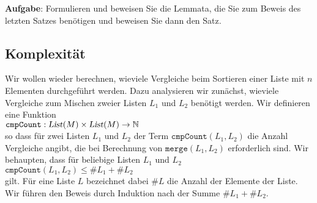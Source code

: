 \noindent
\textbf{Aufgabe}:  Formulieren und beweisen Sie die Lemmata, die Sie zum Beweis des letzten Satzes ben\"otigen
und beweisen Sie dann den Satz.

\subsection{Komplexit\"at}
Wir wollen wieder berechnen, wieviele Vergleiche beim Sortieren einer Liste mit $n$
Elementen durchgef\"uhrt werden.  Dazu analysieren wir zun\"achst, wieviele Vergleiche zum
Mischen zweier Listen $L_1$ und $L_2$ ben\"otigt werden.  Wir definieren eine Funktion \\[0.1cm]
\hspace*{1.3cm} 
$\mathtt{cmpCount}: \textsl{List}(M) \times \textsl{List}(M) \rightarrow \mathbb{N}$ \\[0.1cm]
so dass f\"ur zwei Listen $L_1$ und $L_2$ der Term
$\mathtt{cmpCount}(L_1, L_2)$ die Anzahl Vergleiche angibt, die bei Berechnung von $\texttt{merge}(L_1,L_2)$ erforderlich sind. 
Wir behaupten, dass f\"ur beliebige Listen $L_1$ und $L_2$  \\[0.1cm]
\hspace*{1.3cm} $\mathtt{cmpCount}(L_1, L_2) \leq \# L_1 + \# L_2$ \\[0.1cm]
gilt.  F\"ur eine Liste $L$ bezeichnet dabei $\#L$ die Anzahl der Elemente der Liste.
 Wir f\"uhren den Beweis durch Induktion nach der Summe $\#L_1 + \#L_2$.
